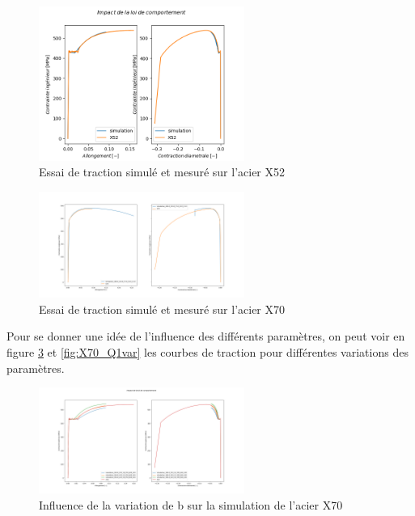 \documentclass[a4paper, french, 11pt]{article}
\begin{document}
    \begin{figure}[ht]
        \includegraphics[width=0.6\textwidth]{image/INFLUENCE/X52_fit.png}
        \centering
        \caption{Essai de traction simulé et mesuré sur l'acier X52}
        \label{fig:X52_fit}       
    \end{figure}
    \begin{figure}[hbt]
        \includegraphics[width=0.6\textwidth]{image/INFLUENCE/X70_fit.png}
        \centering
        \caption{Essai de traction simulé et mesuré sur l'acier X70} 
        \label{fig:X70_fit}       
    \end{figure}

    Pour se donner une idée de l'influence des différents paramètres, on peut voir en figure \ref{fig:X52_bvar} et \ref{fig:X70_Q1var} les courbes de traction pour différentes variations des paramètres.
    
    \begin{figure}[hbt]
        \includegraphics[width=0.6\textwidth]{image/INFLUENCE/X52_b_var_18 23_30.png}
        \centering
        \caption{Influence de la variation de b sur la simulation de l'acier X70}
 
        \label{fig:X52_bvar}
    \end{figure}
\end{document}
